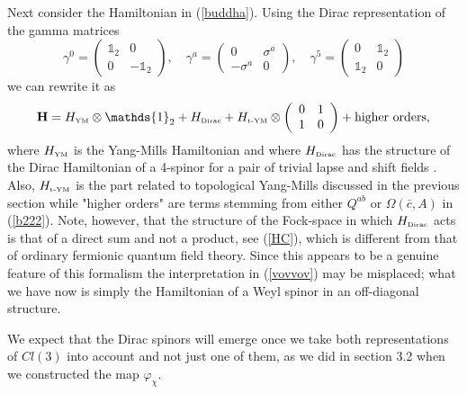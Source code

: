 \documentclass[12pt]{article}
\def\OO{\Omega}
\begin{document}
Next consider the Hamiltonian in (\ref{buddha}). Using the Dirac representation of the gamma matrices
$$
\gamma^0 =
 \left(\begin{array}{cc}
\mathds{1}_2 & 0\\
0 & -\mathds{1}_2
\end{array}\right), 
\quad
\gamma^a =
 \left(\begin{array}{cc}
0 &  \sigma^a\\
-  \sigma^a & 0
\end{array}\right),
\quad
\gamma^5=
 \left(\begin{array}{cc}
0 & \mathds{1}_2\\
\mathds{1}_2 & 0
\end{array}\right)
$$
we can rewrite it as
\begin{equation}
{\mathbf{H}} = H_{\mbox{\tiny YM}} \otimes \mathds{1}_2 + H_{\mbox{\tiny Dirac}} + H_{\mbox{\tiny t-YM}} \otimes \left(\begin{array}{cc}
0&1 \\
  1 & 0
\end{array}\right)  + \mbox{higher orders},
\label{vovvov}
\end{equation}
where $H_{\mbox{\tiny YM}}$ is the Yang-Mills Hamiltonian and where $H_{\mbox{\tiny Dirac}}$ has the structure of the Dirac Hamiltonian of a 4-spinor for a pair of trivial lapse and shift fields \cite{Paschke}. Also, $H_{\mbox{\tiny t-YM}}$ is the part related to topological Yang-Mills discussed in the previous section while "higher orders" are terms stemming from either $Q^{ab}$ or $\OO(\bar{c},A)$ in (\ref{b222}).
Note, however, that the structure of the Fock-space in which $H_{\mbox{\tiny Dirac}}$ acts is that of a direct sum and not a product, see (\ref{HC}), which is different from that of ordinary fermionic quantum field theory. Since this appears to be a genuine feature of this formalism the interpretation in (\ref{vovvov}) may be misplaced; what we have now is simply the Hamiltonian of a Weyl spinor in an off-diagonal structure. 

We expect that the Dirac spinors will emerge once we take both representations of $Cl(3)$ into account and not just one of them, as we did in section 3.2 when we constructed the map $\varphi_\chi$.
\end{document}
